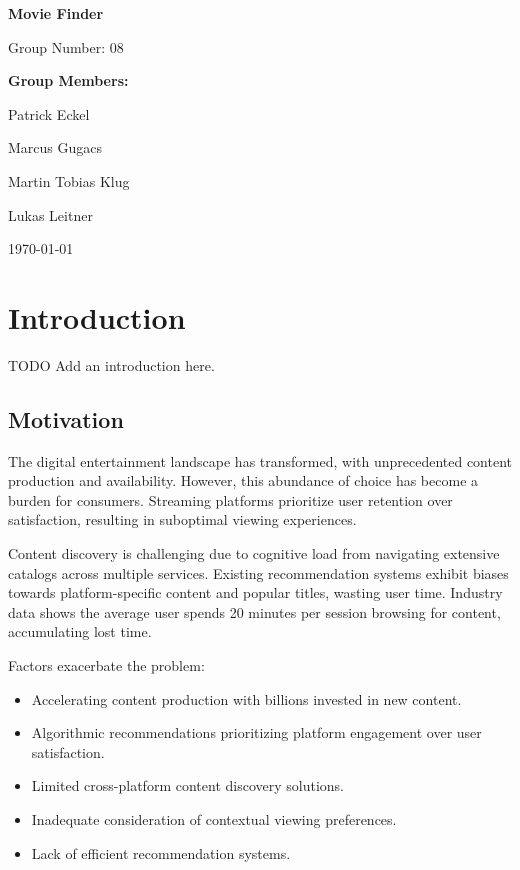 \documentclass[12pt,a4paper]{article}
\begin{document}
  \begin{titlepage}
    \begin{center}
      \vspace*{2cm}
      {\huge\bfseries Movie Finder\par}
      \vspace{2cm}
      {\Large Group Number: 08\par}
      \vspace{1.5cm}
      {\large\bfseries Group Members:\par}
      \vspace{0.5cm}
      {\large
      Patrick Eckel\par
      Marcus Gugacs\par
      Martin Tobias Klug\par
      Lukas Leitner\par
      }
      \vfill
      {\large \today\par}
    \end{center}
  \end{titlepage}

  \tableofcontents
  \newpage

  \section{Introduction}

  TODO Add an introduction here.

  \subsection{Motivation}

  The digital entertainment landscape has transformed, with unprecedented content production and availability.
  However, this abundance of choice has become a burden for consumers. Streaming platforms prioritize user retention
  over satisfaction, resulting in suboptimal viewing experiences.

  \noindent Content discovery is challenging due to cognitive load from navigating extensive catalogs across multiple services.
  Existing recommendation systems exhibit biases towards platform-specific content and popular titles, wasting user time.
  Industry data shows the average user spends 20 minutes per session browsing for content, accumulating lost time.

  \noindent Factors exacerbate the problem:
  \begin{itemize}
    \item Accelerating content production with billions invested in new content.
    \item Algorithmic recommendations prioritizing platform engagement over user satisfaction.
    \item Limited cross-platform content discovery solutions.
    \item Inadequate consideration of contextual viewing preferences.
    \item Lack of efficient recommendation systems.
  \end{itemize}
\end{document}
